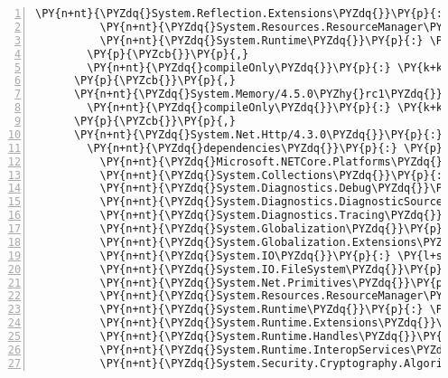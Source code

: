 \begin{Verbatim}[commandchars=\\\{\},numbers=left,firstnumber=1,stepnumber=1,numberblanklines=0]
          \PY{n+nt}{\PYZdq{}System.Reflection.Extensions\PYZdq{}}\PY{p}{:} \PY{l+s+s2}{\PYZdq{}4.3.0\PYZdq{}}\PY{p}{,}
          \PY{n+nt}{\PYZdq{}System.Resources.ResourceManager\PYZdq{}}\PY{p}{:} \PY{l+s+s2}{\PYZdq{}4.3.0\PYZdq{}}\PY{p}{,}
          \PY{n+nt}{\PYZdq{}System.Runtime\PYZdq{}}\PY{p}{:} \PY{l+s+s2}{\PYZdq{}4.3.0\PYZdq{}}
        \PY{p}{\PYZcb{}}\PY{p}{,}
        \PY{n+nt}{\PYZdq{}compileOnly\PYZdq{}}\PY{p}{:} \PY{k+kc}{true}
      \PY{p}{\PYZcb{}}\PY{p}{,}
      \PY{n+nt}{\PYZdq{}System.Memory/4.5.0\PYZhy{}rc1\PYZdq{}}\PY{p}{:} \PY{p}{\PYZob{}}
        \PY{n+nt}{\PYZdq{}compileOnly\PYZdq{}}\PY{p}{:} \PY{k+kc}{true}
      \PY{p}{\PYZcb{}}\PY{p}{,}
      \PY{n+nt}{\PYZdq{}System.Net.Http/4.3.0\PYZdq{}}\PY{p}{:} \PY{p}{\PYZob{}}
        \PY{n+nt}{\PYZdq{}dependencies\PYZdq{}}\PY{p}{:} \PY{p}{\PYZob{}}
          \PY{n+nt}{\PYZdq{}Microsoft.NETCore.Platforms\PYZdq{}}\PY{p}{:} \PY{l+s+s2}{\PYZdq{}2.1.0\PYZhy{}rc1\PYZdq{}}\PY{p}{,}
          \PY{n+nt}{\PYZdq{}System.Collections\PYZdq{}}\PY{p}{:} \PY{l+s+s2}{\PYZdq{}4.3.0\PYZdq{}}\PY{p}{,}
          \PY{n+nt}{\PYZdq{}System.Diagnostics.Debug\PYZdq{}}\PY{p}{:} \PY{l+s+s2}{\PYZdq{}4.3.0\PYZdq{}}\PY{p}{,}
          \PY{n+nt}{\PYZdq{}System.Diagnostics.DiagnosticSource\PYZdq{}}\PY{p}{:} \PY{l+s+s2}{\PYZdq{}4.5.0\PYZhy{}rc1\PYZdq{}}\PY{p}{,}
          \PY{n+nt}{\PYZdq{}System.Diagnostics.Tracing\PYZdq{}}\PY{p}{:} \PY{l+s+s2}{\PYZdq{}4.3.0\PYZdq{}}\PY{p}{,}
          \PY{n+nt}{\PYZdq{}System.Globalization\PYZdq{}}\PY{p}{:} \PY{l+s+s2}{\PYZdq{}4.3.0\PYZdq{}}\PY{p}{,}
          \PY{n+nt}{\PYZdq{}System.Globalization.Extensions\PYZdq{}}\PY{p}{:} \PY{l+s+s2}{\PYZdq{}4.3.0\PYZdq{}}\PY{p}{,}
          \PY{n+nt}{\PYZdq{}System.IO\PYZdq{}}\PY{p}{:} \PY{l+s+s2}{\PYZdq{}4.3.0\PYZdq{}}\PY{p}{,}
          \PY{n+nt}{\PYZdq{}System.IO.FileSystem\PYZdq{}}\PY{p}{:} \PY{l+s+s2}{\PYZdq{}4.3.0\PYZdq{}}\PY{p}{,}
          \PY{n+nt}{\PYZdq{}System.Net.Primitives\PYZdq{}}\PY{p}{:} \PY{l+s+s2}{\PYZdq{}4.3.0\PYZdq{}}\PY{p}{,}
          \PY{n+nt}{\PYZdq{}System.Resources.ResourceManager\PYZdq{}}\PY{p}{:} \PY{l+s+s2}{\PYZdq{}4.3.0\PYZdq{}}\PY{p}{,}
          \PY{n+nt}{\PYZdq{}System.Runtime\PYZdq{}}\PY{p}{:} \PY{l+s+s2}{\PYZdq{}4.3.0\PYZdq{}}\PY{p}{,}
          \PY{n+nt}{\PYZdq{}System.Runtime.Extensions\PYZdq{}}\PY{p}{:} \PY{l+s+s2}{\PYZdq{}4.3.0\PYZdq{}}\PY{p}{,}
          \PY{n+nt}{\PYZdq{}System.Runtime.Handles\PYZdq{}}\PY{p}{:} \PY{l+s+s2}{\PYZdq{}4.3.0\PYZdq{}}\PY{p}{,}
          \PY{n+nt}{\PYZdq{}System.Runtime.InteropServices\PYZdq{}}\PY{p}{:} \PY{l+s+s2}{\PYZdq{}4.3.0\PYZdq{}}\PY{p}{,}
          \PY{n+nt}{\PYZdq{}System.Security.Cryptography.Algorithms\PYZdq{}}\PY{p}{:} \PY{l+s+s2}{\PYZdq{}4.3.0\PYZdq{}}\PY{p}{,}

\end{Verbatim}
